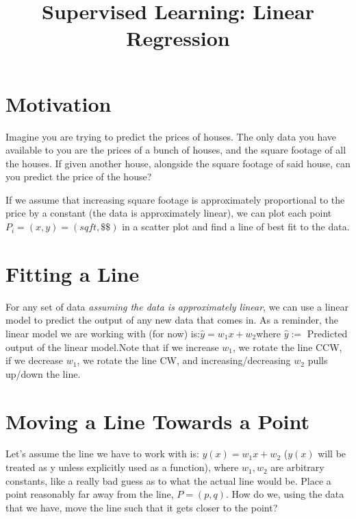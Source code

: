 \documentclass{article}
\title{Supervised Learning: Linear Regression}
\begin{document}
\maketitle
\section{Motivation}
Imagine you are trying to predict the prices of houses. The only data you have available to you are the prices of a bunch of houses, and the square footage of all the houses. If given another house, alongside the square footage of said house, can you predict the price of the house?

If we assume that increasing square footage is approximately proportional to the price by a constant (the data is approximately linear), we can plot each point $P_i = (x, y) = (sq ft, \$\$)$ in a scatter plot and find a line of best fit to the data.

\section{Fitting a Line}
For any set of data \emph{assuming the data is approximately linear}, we can use a linear model to predict the output of any new data that comes in. 
As a reminder, the linear model we are working with (for now) is:\newline $\hat{y} = w_1x + w_2$\newline where \newline $\hat{y} :=$ Predicted output of the linear model.\newline Note that if we increase $w_1$, we rotate the line CCW, if we decrease $w_1$, we rotate the line CW, and increasing/decreasing $w_2$ pulls up/down the line.
\section{Moving a Line Towards a Point}
Let's assume the line we have to work with is: $y(x) = w_1x + w_2$ ($y(x)$ will be treated as y unless explicitly used as a function), where $w_1, w_2$ are arbitrary constants, like a really bad guess as to what the actual line would be. Place a point reasonably far away from the line, $P = (p, q)$. How do we, using the data that we have, move the line such that it gets closer to the point? 
\end{document}
